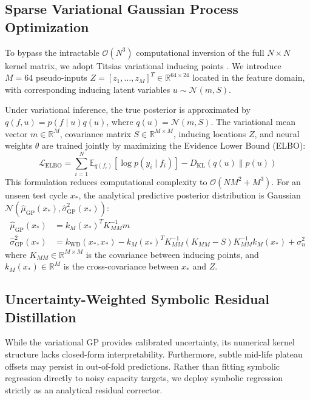 \documentclass[a4paper,fleqn]{cas-sc}
\begin{document}
\subsection{Sparse Variational Gaussian Process Optimization}
To bypass the intractable $\mathcal{O}(N^3)$ computational inversion of the full $N \times N$ kernel matrix, we adopt Titsias variational inducing points \cite{titsias2009variational}. We introduce $M=64$ pseudo-inputs $Z = [z_1, \dots, z_M]^T \in \mathbb{R}^{64 \times 24}$ located in the feature domain, with corresponding inducing latent variables $u \sim \mathcal{N}(m, S)$. 

Under variational inference, the true posterior is approximated by $q(f, u) = p(f \mid u) q(u)$, where $q(u) = \mathcal{N}(m, S)$. The variational mean vector $m \in \mathbb{R}^M$, covariance matrix $S \in \mathbb{R}^{M \times M}$, inducing locations $Z$, and neural weights $\theta$ are trained jointly by maximizing the Evidence Lower Bound (ELBO):
\begin{equation}
    \mathcal{L}_{\text{ELBO}} = \sum_{i=1}^N \mathbb{E}_{q(f_i)} \left[ \log p(y_i \mid f_i) \right] - D_{\text{KL}}\left( q(u) \parallel p(u) \right)
\end{equation}
This formulation reduces computational complexity to $\mathcal{O}(NM^2 + M^3)$. For an unseen test cycle $x_*$, the analytical predictive posterior distribution is Gaussian $\mathcal{N}(\hat{\mu}_{\text{GP}}(x_*), \hat{\sigma}_{\text{GP}}^2(x_*))$:
\begin{align}
    \hat{\mu}_{\text{GP}}(x_*) &= k_M(x_*)^T K_{MM}^{-1} m \\
    \hat{\sigma}_{\text{GP}}^2(x_*) &= k_{\text{WD}}(x_*, x_*) - k_M(x_*)^T K_{MM}^{-1} (K_{MM} - S) K_{MM}^{-1} k_M(x_*) + \sigma_n^2
\end{align}
where $K_{MM} \in \mathbb{R}^{M \times M}$ is the covariance between inducing points, and $k_M(x_*) \in \mathbb{R}^M$ is the cross-covariance between $x_*$ and $Z$.

\subsection{Uncertainty-Weighted Symbolic Residual Distillation}
While the variational GP provides calibrated uncertainty, its numerical kernel structure lacks closed-form interpretability. Furthermore, subtle mid-life plateau offsets may persist in out-of-fold predictions. Rather than fitting symbolic regression directly to noisy capacity targets, we deploy symbolic regression strictly as an analytical residual corrector.
\end{document}

